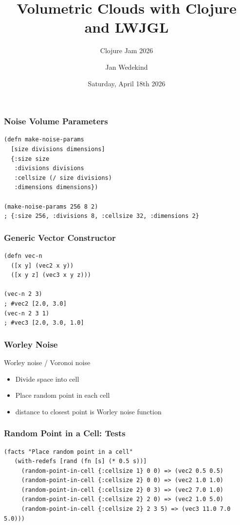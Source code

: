 \documentclass[aspectratio=169,11pt,xcolor=dvipsnames]{beamer}
\title{Volumetric Clouds with Clojure and LWJGL}
\subtitle{Clojure Jam 2026}
\author{Jan Wedekind}
\date{Saturday, April 18th 2026}
\begin{document}
\begin{frame}
  \begin{center}
  \titlepage{}
  \end{center}
\end{frame}

\begin{frame}[fragile]
  \frametitle{Noise Volume Parameters}
  \begin{verbatim}
(defn make-noise-params
  [size divisions dimensions]
  {:size size
   :divisions divisions
   :cellsize (/ size divisions)
   :dimensions dimensions})

(make-noise-params 256 8 2)
; {:size 256, :divisions 8, :cellsize 32, :dimensions 2}
  \end{verbatim}
\end{frame}

\begin{frame}[fragile]
  \frametitle{Generic Vector Constructor}
  \begin{verbatim}
(defn vec-n
  ([x y] (vec2 x y))
  ([x y z] (vec3 x y z)))

(vec-n 2 3)
; #vec2 [2.0, 3.0]
(vec-n 2 3 1)
; #vec3 [2.0, 3.0, 1.0]
  \end{verbatim}
\end{frame}

\begin{frame}
  \frametitle{Worley Noise}
  \begin{center}
    Worley noise / Voronoi noise
    \begin{itemize}
      \item Divide space into cell
      \item Place random point in each cell
      \item distance to closest point is Worley noise function
    \end{itemize}
  \end{center}
\end{frame}

\begin{frame}[fragile]
  \frametitle{Random Point in a Cell: Tests}
  \begin{verbatim}
(facts "Place random point in a cell"
   (with-redefs [rand (fn [s] (* 0.5 s))]
     (random-point-in-cell {:cellsize 1} 0 0) => (vec2 0.5 0.5)
     (random-point-in-cell {:cellsize 2} 0 0) => (vec2 1.0 1.0)
     (random-point-in-cell {:cellsize 2} 0 3) => (vec2 7.0 1.0)
     (random-point-in-cell {:cellsize 2} 2 0) => (vec2 1.0 5.0)
     (random-point-in-cell {:cellsize 2} 2 3 5) => (vec3 11.0 7.0 5.0)))
  \end{verbatim}
\end{frame}
\end{document}
